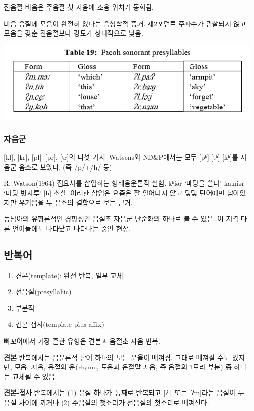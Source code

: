 전음절 비음은 주음절 첫 자음에 조음 위치가 동화됨.

비음 음절에 모음이 완전히 없다는 음성학적 증거. 제2포먼트 주파수가 관찰되지 않고 모음을 갖춘 전음절보다 강도가 상대적으로 낮음.

\includegraphics{Pacoh/src/PacohTable19.png}

\subsubsection{자음군}
[kl], [kr], [pl], [pr], [tr]의 다섯 가지. Watsons와 ND\&P에서는 모두 [pʰ] [tʰ] [kʰ]를 자음군 음소로 보았다. (즉 /p/+/h/ 등)

R. Watson(1964) 접요사를 삽입하는 형태음운론적 실험.
kʰiər `마당을 쓸다' ka.niər `마당 빗자루' [h] 소실. 이러한 삽입은 요즘은 잘 일어나지 않고 몇몇 단어에만 남아있지만 유기음을 두 음소의 결합으로 보는 근거.

동남아의 유형론적인 경향성인 음절초 자음군 단순화의 하나로 볼 수 있음. 이 지역 다른 언어들에도 나타났고 나타나는 중인 현상.

\subsection{반복어}
\begin{enumerate}
\item 견본(template): 완전 반복, 일부 교체
\item 전음절(presyllabic)
\item 부분적
\item 견본-접사(template-plus-affix)
\end{enumerate}

빠꼬어에서 가장 흔한 유형은 견본과 음절초 자음 반복.

\textbf{견본} 반복에서는 음운론적 단어 하나의 모든 운율이 베껴짐. 그대로 베껴질 수도 있지만, 모음, 자음, 음절의 운(rhyme, 모음과 음절말 자음, 즉 음절의 1모라 부분) 중 하나는 교체될 수 있음.

\textbf{견본-접사} 반복에서는 (1) 음절 하나가 통째로 반복되고 [ʔi] 또는 [ʔm]라는 음절이 두 음절 사이에 끼거나 (2) 주음절의 첫소리가 전음절의 첫소리로 베껴진다.

